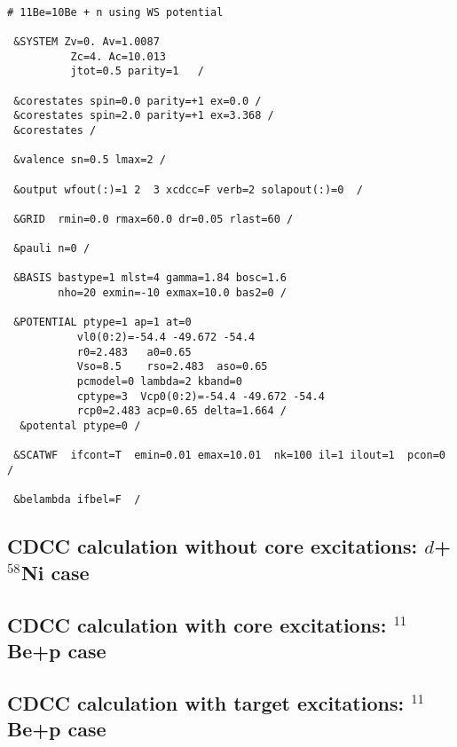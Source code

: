 \documentclass[preprint,12pt]{elsarticle}
\begin{document}
\begin{verbatim}

# 11Be=10Be + n using WS potential

 &SYSTEM Zv=0. Av=1.0087
          Zc=4. Ac=10.013
          jtot=0.5 parity=1   /

 &corestates spin=0.0 parity=+1 ex=0.0 /
 &corestates spin=2.0 parity=+1 ex=3.368 /
 &corestates /

 &valence sn=0.5 lmax=2 /

 &output wfout(:)=1 2  3 xcdcc=F verb=2 solapout(:)=0  /

 &GRID  rmin=0.0 rmax=60.0 dr=0.05 rlast=60 /

 &pauli n=0 /
  
 &BASIS bastype=1 mlst=4 gamma=1.84 bosc=1.6
        nho=20 exmin=-10 exmax=10.0 bas2=0 /
 
 &POTENTIAL ptype=1 ap=1 at=0 
           vl0(0:2)=-54.4 -49.672 -54.4
           r0=2.483   a0=0.65  
           Vso=8.5    rso=2.483  aso=0.65 
           pcmodel=0 lambda=2 kband=0
           cptype=3  Vcp0(0:2)=-54.4 -49.672 -54.4 
           rcp0=2.483 acp=0.65 delta=1.664 /
  &potental ptype=0 /

 &SCATWF  ifcont=T  emin=0.01 emax=10.01  nk=100 il=1 ilout=1  pcon=0 /

 &belambda ifbel=F  /

\end{verbatim}

\subsection{CDCC calculation without core excitations: $d$+$^{58}$Ni case}



\subsection{CDCC calculation with core excitations: $^{11}$Be+p case}


\subsection{CDCC calculation with target excitations: $^{11}$Be+p case}
\end{document}
